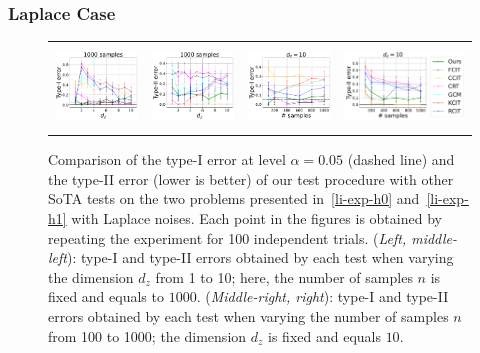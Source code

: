 \subsubsection{Laplace Case}
\vspace{-0.4cm}
\begin{figure}[h]
\begin{tabular}{cccc} 
\includegraphics[height=2.2cm]{sections/appendix/independence_testing_kernel/new_figures_lap/nsamples_fixed_1000_li_dim_1_10_typeI.pdf}& \includegraphics[height=2.2cm]{sections/appendix/independence_testing_kernel/new_figures_lap/nsamples_fixed_1000_li_dim_1_10_typeII.pdf} & 
\includegraphics[height=2.2cm]{sections/appendix/independence_testing_kernel/new_figures_lap/dim_fixed_10_li_typeI.pdf}& \includegraphics[height=2.2cm]{sections/appendix/independence_testing_kernel/new_figures_lap/dim_fixed_10_li_typeII.pdf} 
\end{tabular}
\caption{Comparison of the type-I error at level $\alpha=0.05$ (dashed line) and the type-II error (lower is better) of our test procedure with other SoTA tests on the two problems presented in~\eqref{li-exp-h0} and~\eqref{li-exp-h1}  with Laplace noises. Each point in the figures is obtained by repeating the experiment for 100 independent trials. (\emph{Left, middle-left}): type-I and type-II errors obtained by each test when varying the dimension $d_z$ from 1 to 10; here, the number of samples $n$ is fixed and equals to $1000$. (\emph{Middle-right, right}): type-I and type-II errors obtained by each test when varying the number of samples $n$ from 100 to 1000; the dimension $d_z$ is fixed and equals $10$. 
\label{fig-exp-li-laplace-supp}}
\vspace{-0.5cm}
\end{figure}

